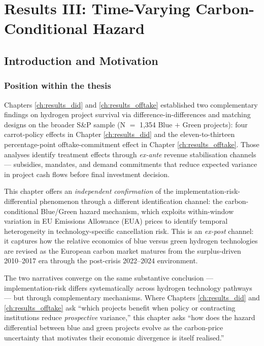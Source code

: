 \chapter{Results III: Time-Varying Carbon-Conditional Hazard}
\label{ch:results_tvp}
\section{Introduction and Motivation}
\label{sec:ch7-intro}

\subsection*{Position within the thesis}

Chapters \ref{ch:results_did} and \ref{ch:results_offtake} established two complementary findings on hydrogen project survival via difference-in-differences and matching designs on the broader S\&P sample (N $=$ 1,354 Blue $+$ Green projects): four carrot-policy effects in Chapter \ref{ch:results_did} and the eleven-to-thirteen percentage-point offtake-commitment effect in Chapter \ref{ch:results_offtake}. Those analyses identify treatment effects through \emph{ex-ante} revenue stabilisation channels --- subsidies, mandates, and demand commitments that reduce expected variance in project cash flows before final investment decision.

This chapter offers an \emph{independent confirmation} of the implementation-risk-differential phenomenon through a different identification channel: the carbon-conditional Blue/Green hazard mechanism, which exploits within-window variation in EU Emissions Allowance (EUA) prices to identify temporal heterogeneity in technology-specific cancellation risk. This is an \emph{ex-post} channel: it captures how the relative economics of blue versus green hydrogen technologies are revised as the European carbon market matures from the surplus-driven 2010--2017 era through the post-crisis 2022--2024 environment.

The two narratives converge on the same substantive conclusion --- implementation-risk differs systematically across hydrogen technology pathways --- but through complementary mechanisms. Where Chapters \ref{ch:results_did} and \ref{ch:results_offtake} ask ``which projects benefit when policy or contracting institutions reduce \emph{prospective} variance,'' this chapter asks ``how does the hazard differential between blue and green projects evolve as the carbon-price uncertainty that motivates their economic divergence is itself realised.''

